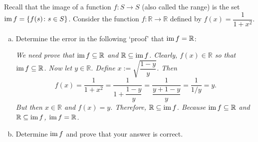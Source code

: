 \documentclass[11pt,letterpaper]{article}
\begin{document}
\newpage





 Recall that the image of a function $f: S \to S$ (also called the range) is the set $\operatorname{im} f= \{ f(s) \colon s \in S \}$. Consider the function $f: \mathbb{R} \to \mathbb{R}$ defined by $f(x)= \dfrac{1}{1 + x^2}$. 
\begin{enumerate}[(a)]
\item Determine the error in the following `proof' that $\operatorname{im} f= \mathbb{R}$: \pspace

{\itshape We need prove that $\operatorname{im} f \subseteq \mathbb{R}$ and $\mathbb{R} \subseteq \operatorname{im} f$. Clearly, $f(x) \in \mathbb{R}$ so that $\operatorname{im} f \subseteq \mathbb{R}$. Now let $y \in \mathbb{R}$. Define $x:= \sqrt{\dfrac{1 - y}{y}}$. Then
	\[
	f(x)= \dfrac{1}{1 + x^2}= \dfrac{1}{1 + \dfrac{1 - y}{y}}= \dfrac{1}{\dfrac{y + 1 - y}{y}}= \dfrac{1}{1/y}= y.
	\]
But then $x \in \mathbb{R}$ and $f(x)= y$. Therefore, $\mathbb{R} \subseteq \operatorname{im} f$. Because $\operatorname{im} f \subseteq \mathbb{R}$ and $\mathbb{R} \subseteq \operatorname{im} f$, $\operatorname{im} f = \mathbb{R}$.}

\item Determine $\operatorname{im} f$ and prove that your answer is correct. 
\end{enumerate}
\end{document}
